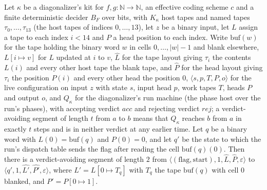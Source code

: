 \begin{theorem}
\label{Turing.NTimeDiag.dz_flag}
\leanok
{}
Let $\kappa$ be a diagonalizer's kit for $f, g : \mathbb{N} \to \mathbb{N}$, an effective coding scheme $c$ and a finite deterministic decider $B_F$ over bits, with $K_\kappa$ host tapes and named tapes $\tau_0, \dots, \tau_{13}$ (the host tapes of indices $0, \dots, 13$), let $z$ be a binary input, let $L$ assign a tape to each index $i < 14$ and $P$ a head position to each index. Write $\mathrm{buf}(w)$ for the tape holding the binary word $w$ in cells $0, \dots, |w| - 1$ and blank elsewhere, $L[i \mapsto v]$ for $L$ updated at $i$ to $v$, $\hat L$ for the tape layout giving $\tau_i$ the contents $L(i)$ and every other host tape the blank tape, and $\hat P$ for the head layout giving $\tau_i$ the position $P(i)$ and every other head the position $0$, $\langle s, p, T, P, o\rangle$ for the live configuration on input $z$ with state $s$, input head $p$, work tapes $T$, heads $P$ and output $o$, and $Q_\kappa$ for the diagonalizer's run machine (the phase host over the run's phases), with accepting verdict $\mathit{acc}$ and rejecting verdict $\mathit{rej}$; a verdict-avoiding segment of length $t$ from $a$ to $b$ means that $Q_\kappa$ reaches $b$ from $a$ in exactly $t$ steps and is in neither verdict at any earlier time. Let $q$ be a binary word with $L(0) = \mathrm{buf}(q)$ and $P(0) = 0$, and let $q'$ be the state to which the run's dispatch table sends the flag after reading the cell $\mathrm{buf}(q)(0)$. Then there is a verdict-avoiding segment of length $2$ from $\langle (\text{flag}, \text{start}), 1, \hat L, \hat P, \varepsilon\rangle$ to $\langle q', 1, \hat{L'}, \hat{P'}, \varepsilon\rangle$, where $L' = L[0 \mapsto T_q]$ with $T_q$ the tape $\mathrm{buf}(q)$ with cell $0$ blanked, and $P' = P[0 \mapsto 1]$.
\end{theorem}

